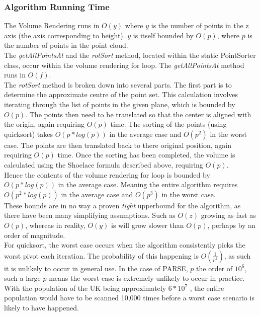 \subsubsection{Algorithm Running Time}
The Volume Rendering runs in $O(y)$ where $y$ is the number of points in the z axis (the axis corresponding to height). 
$y$ is itself bounded by $O(p)$, where $p$ is the number of points in the point cloud. \\

The \textit{getAllPointsAt} and the \textit{rotSort} method, located within the static PointSorter class, occur within the volume rendering for loop. 
The  \textit{getAllPointsAt} method runs in  $O(f)$.\\

The \textit{rotSort} method is broken down into several parts. 
The first part is to determine the approximate centre of the point set. 
This calculation involves iterating through the list of points in the given plane, which is bounded by $O(p)$. 
The points then need to be translated so that the center is aligned with the origin, again requiring $O(p)$ time. 
The sorting of the points (using quicksort) takes $O(p * log(p))$ in the average case and $O(p^2)$ in the worst case. 
The points are then translated back to there original position, again requiring $O(p)$ time. 
Once the sorting has been completed, the volume is calculated using the Shoelace formula described above, requiring $O(p)$.\\

Hence the contents of the volume rendering for loop is bounded by $O(p * log(p))$ in the average case. 
Meaning the entire algorithm requires $O(p^2 * log(p))$ in the average case and $O(p^3)$ in the worst case. \\

These bounds are in no way a proven \textit{tight} upperbound for the algorithm, as there have been many simplifying assumptions. 
Such as $O(z)$ growing as fast as $O(p)$, whereas in reality, $O(y)$ is will grow slower than $O(p)$, perhaps by an order of magnitude.\\

For quicksort, the worst case occurs when the algorithm consistently picks the worst pivot each iteration. 
The probability of this happening is $O(\frac{1}{p^2})$, as such it is unlikely to occur in general use. 
In the case of PARSE, $p$ the order of $10^6$, such a large $p$ means the worst case is extremely unlikely to occur in practice. With the population of the UK being approximately $6 * 10^7$ \cite{UnitedKingdomofGreatBritain2011}, the entire population would have to be scanned 10,000 times before a worst case scenario is likely to have happened.